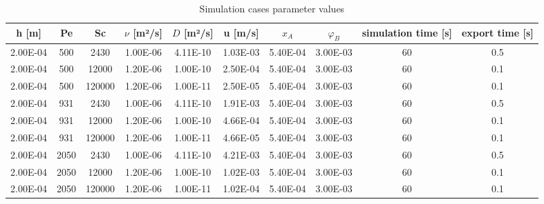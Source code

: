 \documentclass[../thesis.tex]{subfiles}
\begin{document}
\begin{landscape}
	\begin{table}[htb]
		\centering
		\caption{Simulation cases parameter values}
		\label{tab: cases}
		\small
		\begin{tabular}{cccccccccc}
			h [m] & Pe & Sc & $\nu$ [m²/s] & $D$ [m²/s] & u [m/s] & $x_A$ & $\varphi_B$ & simulation time [s] & export time [s] \\
			\hline
			2.00E-04            & 500         & 2430        & 1.00E-06               & 4.11E-10               & 1.03E-03              & 5.40E-04      & 3.00E-03        & 60                            & 0.5                       \\
			2.00E-04            & 500         & 12000       & 1.20E-06               & 1.00E-10               & 2.50E-04              & 5.40E-04      & 3.00E-03        & 60                            & 0.1                       \\
			2.00E-04            & 500         & 120000      & 1.20E-06               & 1.00E-11               & 2.50E-05              & 5.40E-04      & 3.00E-03        & 60                            & 0.1                       \\
			2.00E-04            & 931         & 2430        & 1.00E-06               & 4.11E-10               & 1.91E-03              & 5.40E-04      & 3.00E-03        & 60                            & 0.5                       \\
			2.00E-04            & 931         & 12000       & 1.20E-06               & 1.00E-10               & 4.66E-04              & 5.40E-04      & 3.00E-03        & 60                            & 0.1                       \\
			2.00E-04            & 931         & 120000      & 1.20E-06               & 1.00E-11               & 4.66E-05              & 5.40E-04      & 3.00E-03        & 60                            & 0.1                       \\
			2.00E-04            & 2050        & 2430        & 1.00E-06               & 4.11E-10               & 4.21E-03              & 5.40E-04      & 3.00E-03        & 60                            & 0.5                       \\
			2.00E-04            & 2050        & 12000       & 1.20E-06               & 1.00E-10               & 1.02E-03              & 5.40E-04      & 3.00E-03        & 60                            & 0.1                       \\
			2.00E-04            & 2050        & 120000      & 1.20E-06               & 1.00E-11               & 1.02E-04              & 5.40E-04      & 3.00E-03        & 60                            & 0.1                       \\

\end{tabular}
\end{table}
\end{landscape}
\end{document}
